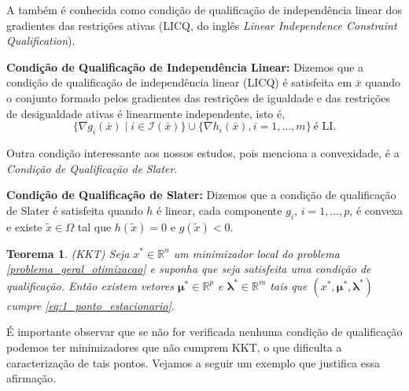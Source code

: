 \documentclass[12pt,a4paper]{scrartcl}
\def\RR{\mathds{R}}
\def\xbar{\bar{x}}
\newtheorem{teo}{Teorema}
\theoremstyle{definition}%
\begin{document}
A  também é conhecida como condição de qualificação de independência linear dos gradientes das restrições ativas (LICQ, do inglês \emph{Linear Independence Constraint Qualification}).

\textbf{Condição de Qualificação de Independência Linear:} Dizemos que a condição de qualificação de independência linear (LICQ) é satisfeita em $\xbar$ quando o conjunto formado pelos gradientes das restrições de igualdade e das restrições de desigualdade ativas é linearmente independente, isto é, 
\[
\{ \nabla g_{i}(\xbar) \mid i \in \mathcal{I}(\xbar) \} \cup \{ \nabla h_{i}(\xbar), i=1, \ldots , m \} \ \text{é LI}.
\] 

Outra condição interessante aos nossos estudos, pois menciona a convexidade, é a \emph{Condição de Qualificação de Slater}.

\textbf{Condição de Qualificação de Slater:} Dizemos que a condição de qualificação de Slater é satisfeita quando $h$ é linear, cada componente $g_{i}$, $i=1, \ldots , p$, é convexa e existe $\tilde{x} \in \Omega$ tal que $h(\tilde{x})=0$ e $g(\tilde{x})<0$.



\begin{teo}(\emph{KKT}) Seja $x^{*} \in \RR^{n}$ um minimizador local do problema \eqref{problema_geral_otimizacao} e suponha que seja satisfeita uma condição de qualificação. Então existem vetores $\boldsymbol{\mu}^{*} \in \RR^{p}$ e $\boldsymbol{\lambda}^{*} \in \RR^{m}$ tais que $(x^{*} , \boldsymbol{\mu}^{*} , \boldsymbol{\lambda}^{*} )$ cumpre \eqref{eq:1_ponto_estacionario}.
\end{teo}

É importante observar que se não for verificada nenhuma condição de qualificação podemos ter minimizadores que não cumprem KKT, o que dificulta a caracterização de tais pontos. Vejamos a seguir um exemplo que justifica essa afirmação.
\end{document}
